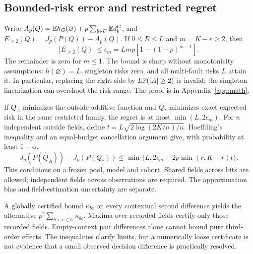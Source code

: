 \subsection{Bounded-risk error and restricted regret}\label{sec:bounds}
Write $A_p(Q)=\mathbb{E} h_G(\varnothing)+p\sum_{b\in U}\mathbb{E} d_b^G$, and $E_{\ge2}(Q)=J_p(P(Q))-A_p(Q)$. If $0\le R\le L$ and $m=K-r\ge2$, then
\begin{equation}\label{eq:bound}
|E_{\ge2}(Q)|\le\epsilon_m=Lmp[1-(1-p)^{m-1}].
\end{equation}
The remainder is zero for $m\le1$. The bound is sharp without monotonicity assumptions: $h(\varnothing)=L$, singleton risks zero, and all multi-fault risks $L$ attain it. In particular, replacing the right side by $L\mathbb{P}(|A|\ge2)$ is invalid; the singleton linearization can overshoot the risk range. The proof is in Appendix~\ref{app:math}.

If $Q_A$ minimizes the outside-additive function and $Q_*$ minimizes exact expected risk in the same restricted family, the regret is at most $\min(L,2\epsilon_m)$. For $n$ independent outside fields, define $t=L\sqrt{2\log(2K/\alpha)/n}$. Hoeffding's inequality and an equal-budget cancellation argument give, with probability at least $1-\alpha$,
\begin{equation}\label{eq:samplebound}
J_p(P(\widehat Q_A))-J_p(P(Q_*))
\le \min\{L,2\epsilon_m+2p\min(r,K-r)t\}.
\end{equation}
This conditions on a frozen pool, model and cohort. Shared fields across bits are allowed; independent fields across observations are required. The approximation bias and field-estimation uncertainty are separate.

A globally certified bound $\kappa_{bc}$ on every contextual second difference yields the alternative $p^2\sum_{b<c\in U}\kappa_{bc}$. Maxima over recorded fields certify only those recorded fields. Empty-context pair differences alone cannot bound pure third-order effects. The inequalities clarify limits, but a numerically loose certificate is not evidence that a small observed decision difference is practically resolved.
